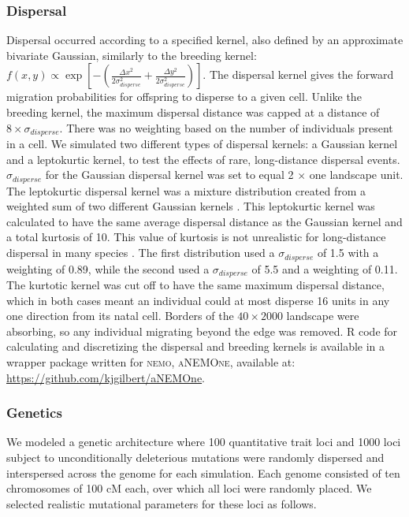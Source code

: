 \subsubsection{Dispersal}
Dispersal occurred according to a specified kernel, also defined by an approximate bivariate Gaussian, similarly to the breeding kernel: $f(x,y) \propto \exp{[-(\frac{\Delta x^2}{2\sigma_{disperse}^2}+\frac{\Delta y^2}{2\sigma_{disperse}^2})]}$. The dispersal kernel gives the forward migration probabilities for offspring to disperse to a given cell. Unlike the breeding kernel, the maximum dispersal distance was capped at a distance of $8 \times \sigma_{disperse}$. %
There was no weighting based on the number of individuals present in a cell. We simulated two different types of dispersal kernels: a Gaussian kernel and a leptokurtic kernel, to test the effects of rare, long-distance dispersal events. $\sigma_{disperse}$ for the Gaussian dispersal kernel was set to equal 2 $\times$ one landscape unit. The leptokurtic dispersal kernel was a mixture distribution created from a weighted sum of two different Gaussian kernels \citep{Ibrahim:1996}. This leptokurtic kernel was calculated to have the same average dispersal distance as the Gaussian kernel and a total kurtosis of 10. This value of kurtosis is not unrealistic for long-distance dispersal in many species \citep{Guttal:2011, Lowe:2009, Skalski:2000}. The first distribution used a $\sigma_{disperse}$ of 1.5 with a weighting of 0.89, while the second used a $\sigma_{disperse}$ of 5.5 and a weighting of 0.11. The kurtotic kernel was cut off to have the same maximum dispersal distance, which in both cases meant an individual could at most disperse 16 units in any one direction from its natal cell. Borders of the $40\times2000$ landscape were absorbing, so any individual migrating beyond the edge was removed. R code for calculating and discretizing the dispersal and breeding kernels is available in a wrapper package written for \textsc{nemo}, \textsc{aNEMOne}, available at: \url{https://github.com/kjgilbert/aNEMOne}.


\subsubsection{Genetics}
We modeled a genetic architecture where 100 quantitative trait loci and 1000 loci subject to unconditionally deleterious mutations were randomly dispersed and interspersed across the genome for each simulation. Each genome consisted of ten chromosomes of 100 cM each, over which all loci were randomly placed. We selected realistic mutational parameters for these loci as follows.

